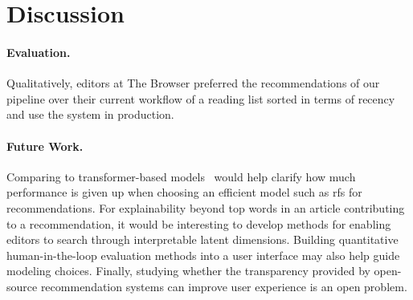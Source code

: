 \section{Discussion}
\paragraph{Evaluation.} Qualitatively, editors at The Browser preferred the recommendations of our pipeline over their current workflow of a reading list sorted in terms of recency and use the system in production.

\paragraph{Future Work.} Comparing to transformer-based models~\citep{devlin2019bert:} would help clarify how much performance is given up when choosing an efficient model such as \gls{rfs} for recommendations. For explainability beyond top words in an article contributing to a recommendation, it would be interesting to develop methods for enabling editors to search through interpretable latent dimensions. Building quantitative human-in-the-loop evaluation methods into a user interface may also help guide modeling choices. Finally, studying whether the transparency provided by open-source recommendation systems can improve user experience is an open problem.